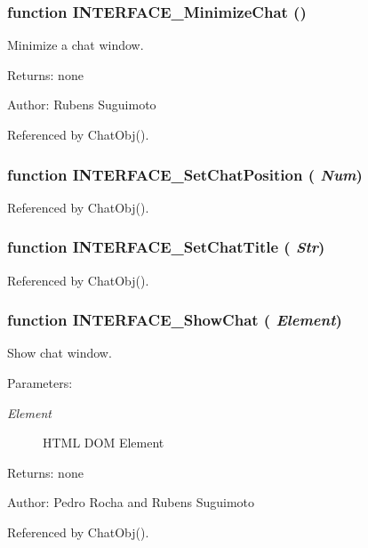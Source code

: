 \subsubsection[INTERFACE\_\-MinimizeChat]{\setlength{\rightskip}{0pt plus 5cm}function INTERFACE\_\-MinimizeChat ()}\label{interface_2chat_8js_ce9e096aefefbc1cbf276cce55232353}


Minimize a chat window. 

\begin{Desc}
\item[Returns:]none \end{Desc}
\begin{Desc}
\item[Author:]Rubens Suguimoto \end{Desc}


Referenced by ChatObj().
\subsubsection[INTERFACE\_\-SetChatPosition]{\setlength{\rightskip}{0pt plus 5cm}function INTERFACE\_\-SetChatPosition ( {\em Num})}\label{interface_2chat_8js_2480f2bff13adedc1e75409517b5f7af}




Referenced by ChatObj().
\subsubsection[INTERFACE\_\-SetChatTitle]{\setlength{\rightskip}{0pt plus 5cm}function INTERFACE\_\-SetChatTitle ( {\em Str})}\label{interface_2chat_8js_d468789fb432dea7311cab7563f1b803}




Referenced by ChatObj().
\subsubsection[INTERFACE\_\-ShowChat]{\setlength{\rightskip}{0pt plus 5cm}function INTERFACE\_\-ShowChat ( {\em Element})}\label{interface_2chat_8js_cabe1242538d3850b4bcc5d4a71e88f8}


Show chat window. 

\begin{Desc}
\item[Parameters:]
\begin{description}
\item[{\em Element}]HTML DOM Element \end{description}
\end{Desc}
\begin{Desc}
\item[Returns:]none \end{Desc}
\begin{Desc}
\item[Author:]Pedro Rocha and Rubens Suguimoto \end{Desc}


Referenced by ChatObj().